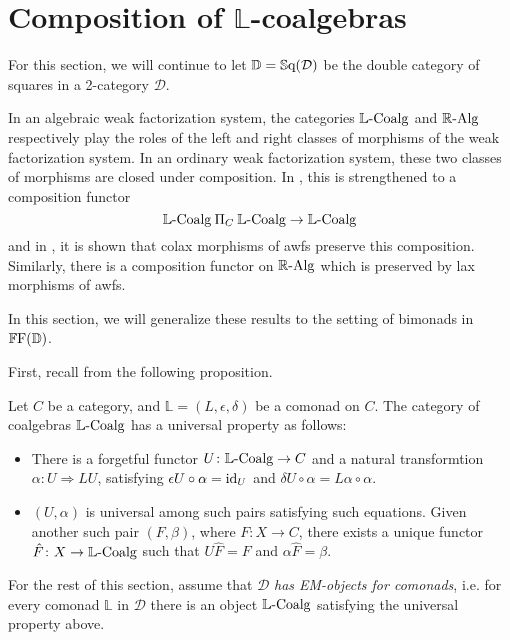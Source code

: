 
\chapter{Composition of $\mathbb{L}$-coalgebras}

For this section, we will continue to let $\mathbb{D}=\mathbb{S}\mathrm{q}(\mathcal{D})$ be the double category of squares in a 2-category $\mathcal{D}$.

In an algebraic weak factorization system, the categories $\mathbb{L}\text{-}\mathrm{Coalg}$ and $\mathbb{R}\text{-}\mathrm{Alg}$ respectively play the roles of the left and right classes of morphisms of the weak factorization system. In an ordinary weak factorization system, these two classes of morphisms are closed under composition. In \cite{garner:soa}, this is strengthened to a composition functor
\[
	\mathbb{L}\text{-}\mathrm{Coalg} \mathbin{\Pi}_C \mathbb{L}\text{-}\mathrm{Coalg} \to \mathbb{L}\text{-}\mathrm{Coalg}
\]
and in \cite{riehl:nwfs-model}, it is shown that colax morphisms of awfs preserve this composition. Similarly, there is a composition functor on $\mathbb{R}\text{-}\mathrm{Alg}$ which is preserved by lax morphisms of awfs.

In this section, we will generalize these results to the setting of bimonads in $\mathbb{F}\mathrm{F}(\mathbb{\mathbb{D}})$.

First, recall from \cite{street:ftm} the following proposition.

\begin{proposition}\label{Prop:EMObject}
	Let $C$ be a category, and $\mathbb{L}=(L,\epsilon,\delta)$ be a comonad on $C$. The category of coalgebras $\mathbb{L}\text{-}\mathrm{Coalg}$ has a universal property as follows:
	\begin{itemize}
	 	\item There is a forgetful functor $U\colon \mathbb{L}\text{-}\mathrm{Coalg} \to C$ and a natural transformtion $\alpha\colon U \Rightarrow LU$, satisfying $\epsilon U\circ\alpha = \operatorname{id}_U$ and $\delta U \circ \alpha = L\alpha\circ\alpha$.
	 	\item $(U,\alpha)$ is universal among such pairs satisfying such equations. Given another such pair $(F,\beta)$, where $F\colon X\to C$, there exists a unique functor $\hat{F}\colon X\to \mathbb{L}\text{-}\mathrm{Coalg}$ such that $U\hat{F}=F$ and $\alpha\hat{F}=\beta$.
	 \end{itemize} 
\end{proposition}

For the rest of this section, assume that $\mathcal{D}$ \emph{has EM-objects for comonads}, i.e. for every comonad $\mathbb{L}$ in $\mathcal{D}$ there is an object $\mathbb{L}\text{-}\mathrm{Coalg}$ satisfying the universal property above.

